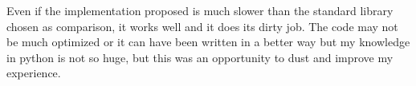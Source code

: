 \documentclass{article}
\begin{document}
Even if the implementation proposed is much slower than the standard library chosen as comparison, it works well and it does its dirty job. The code may not be much optimized or it can have been written in a better way but my knowledge in python is not so huge, but this was an opportunity to dust and improve my experience.





%

\end{document}
